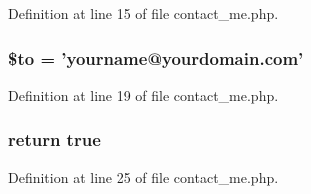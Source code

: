 Definition at line 15 of file contact\+\_\+me.\+php.

\hypertarget{contact__me_8php_ac19f839b525d6d99d063fe56bf2a6d3b}{
\subsubsection[{\$to}]{\setlength{\rightskip}{0pt plus 5cm}\$to = 'yourname@yourdomain.\+com'}}\label{contact__me_8php_ac19f839b525d6d99d063fe56bf2a6d3b}


Definition at line 19 of file contact\+\_\+me.\+php.

\hypertarget{contact__me_8php_a930920b2bc42824a5c03be681830f4b2}{
\subsubsection[{true}]{\setlength{\rightskip}{0pt plus 5cm}return true}}\label{contact__me_8php_a930920b2bc42824a5c03be681830f4b2}


Definition at line 25 of file contact\+\_\+me.\+php.

